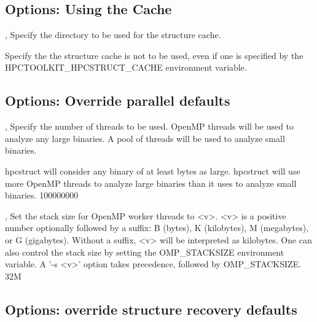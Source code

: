 \documentclass[english]{article}
\begin{document}
\subsection{Options: Using the Cache}
\item[\OptArg{-c}{dir}, \OptArg{--cache}{dir}]
Specify the directory to be used for the structure cache.

\item[\Opt{--nocache}]
Specify the the structure cache is not to be used, even if one is specified by the
HPCTOOLKIT_HPCSTRUCT_CACHE environment variable.

\subsection{Options: Override parallel defaults}
\item[\OptArg{-j}{num}, \OptArg{--jobs}{num}]
Specify the number of threads to be used. 
OpenMP threads will be used to analyze any large
binaries. A pool of  threads will be used to
analyze small binaries.

\item[\OptArg{--psize}{n}]
hpcstruct will consider any binary of at least
 bytes as large. hpcstruct will use more
OpenMP threads to analyze large binaries than
it uses to analyze small binaries.  {100000000}


\item[\OptArg{-s}{v}, \OptArg{--stack}{v}]
Set the stack size for OpenMP worker threads to <v>.
<v> is a positive number optionally followed by
a suffix: B (bytes), K (kilobytes), M (megabytes),
or G (gigabytes). Without a suffix, <v> will be
interpreted as kilobytes. One can also control the
stack size by setting the OMP_STACKSIZE environment
variable. A '-s <v>' option takes precedence,
followed by OMP_STACKSIZE. {32M}

\subsection{Options: override structure recovery defaults}
\end{document}
